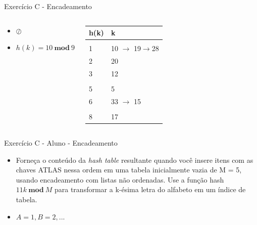 \documentclass{beamer}
\begin{document}
\begin{frame}{Exercício C - Encadeamento}
\begin{columns}
        \footnotesize         
        \begin{block}{}
 		 \begin{itemize}
 		  \item \textbf{$\oslash$}
 		  \item $h(k) = 10 \ \mathbf{mod} \ 9$  
 		 \end{itemize}

 		  \end{block} 
    
        \begin{table}[]
        \centering
        \footnotesize
        \begin{tabular}{|l|l|}
        \hline
        h(k) & k \\ \hline
            &   \\ \hline
        1   & 10 $\rightarrow$ 19$\rightarrow$28  \\ \hline
        2   & 20  \\ \hline
        3   & 12   \\ \hline
            &    \\ \hline
        5   & 5   \\ \hline
        6   & 33 $\rightarrow$ 15   \\ \hline
            &   \\ \hline
        8   & 17  \\ \hline
        \end{tabular}%

        \end{table}       
        \end{columns}
\end{frame}


\begin{frame}{Exercício C - Aluno - Encadeamento}
\begin{itemize}
 \item Forneça o conteúdo da \textit{hash table} resultante quando você insere itens com as chaves ATLAS nessa ordem em uma tabela inicialmente vazia de M = 5, usando encadeamento com listas não ordenadas. Use a função hash $11k \ \mathbf{mod}\ M$ para transformar a k-ésima letra do alfabeto em um índice de tabela.
 \item $A = 1, B = 2, ... $
\end{itemize}

\end{frame}
\end{document}
